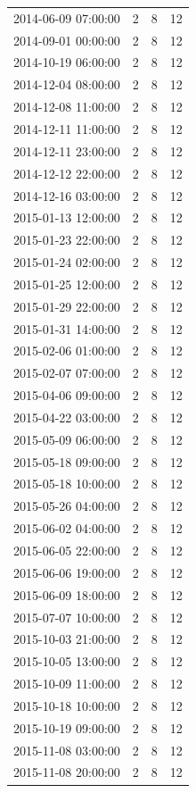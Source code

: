 \begin{tabular}{lrrr}
2014-06-09 07:00:00 & 2 & 8 & 12 \\
2014-09-01 00:00:00 & 2 & 8 & 12 \\
2014-10-19 06:00:00 & 2 & 8 & 12 \\
2014-12-04 08:00:00 & 2 & 8 & 12 \\
2014-12-08 11:00:00 & 2 & 8 & 12 \\
2014-12-11 11:00:00 & 2 & 8 & 12 \\
2014-12-11 23:00:00 & 2 & 8 & 12 \\
2014-12-12 22:00:00 & 2 & 8 & 12 \\
2014-12-16 03:00:00 & 2 & 8 & 12 \\
2015-01-13 12:00:00 & 2 & 8 & 12 \\
2015-01-23 22:00:00 & 2 & 8 & 12 \\
2015-01-24 02:00:00 & 2 & 8 & 12 \\
2015-01-25 12:00:00 & 2 & 8 & 12 \\
2015-01-29 22:00:00 & 2 & 8 & 12 \\
2015-01-31 14:00:00 & 2 & 8 & 12 \\
2015-02-06 01:00:00 & 2 & 8 & 12 \\
2015-02-07 07:00:00 & 2 & 8 & 12 \\
2015-04-06 09:00:00 & 2 & 8 & 12 \\
2015-04-22 03:00:00 & 2 & 8 & 12 \\
2015-05-09 06:00:00 & 2 & 8 & 12 \\
2015-05-18 09:00:00 & 2 & 8 & 12 \\
2015-05-18 10:00:00 & 2 & 8 & 12 \\
2015-05-26 04:00:00 & 2 & 8 & 12 \\
2015-06-02 04:00:00 & 2 & 8 & 12 \\
2015-06-05 22:00:00 & 2 & 8 & 12 \\
2015-06-06 19:00:00 & 2 & 8 & 12 \\
2015-06-09 18:00:00 & 2 & 8 & 12 \\
2015-07-07 10:00:00 & 2 & 8 & 12 \\
2015-10-03 21:00:00 & 2 & 8 & 12 \\
2015-10-05 13:00:00 & 2 & 8 & 12 \\
2015-10-09 11:00:00 & 2 & 8 & 12 \\
2015-10-18 10:00:00 & 2 & 8 & 12 \\
2015-10-19 09:00:00 & 2 & 8 & 12 \\
2015-11-08 03:00:00 & 2 & 8 & 12 \\
2015-11-08 20:00:00 & 2 & 8 & 12 \\

\end{tabular}
